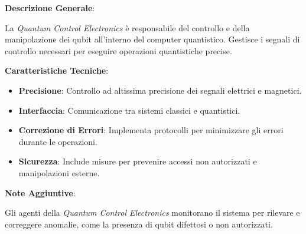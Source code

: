 \begin{tcolorbox}[colback=white,colframe=black,title=\textbf{Quantum Control Electronics}]
\begin{multicols}{2}
\textbf{Descrizione Generale}:

La \emph{Quantum Control Electronics} è responsabile del controllo e della manipolazione dei qubit all'interno del computer quantistico. Gestisce i segnali di controllo necessari per eseguire operazioni quantistiche precise.

\textbf{Caratteristiche Tecniche}:
\begin{itemize}
    \item \textbf{Precisione}: Controllo ad altissima precisione dei segnali elettrici e magnetici.
    \item \textbf{Interfaccia}: Comunicazione tra sistemi classici e quantistici.
    \item \textbf{Correzione di Errori}: Implementa protocolli per minimizzare gli errori durante le operazioni.
    \item \textbf{Sicurezza}: Include misure per prevenire accessi non autorizzati e manipolazioni esterne.
\end{itemize}

\textbf{Note Aggiuntive}:

Gli agenti della \emph{Quantum Control Electronics} monitorano il sistema per rilevare e correggere anomalie, come la presenza di qubit difettosi o non autorizzati.

\end{multicols}
\end{tcolorbox}

\vspace{0.5cm}

